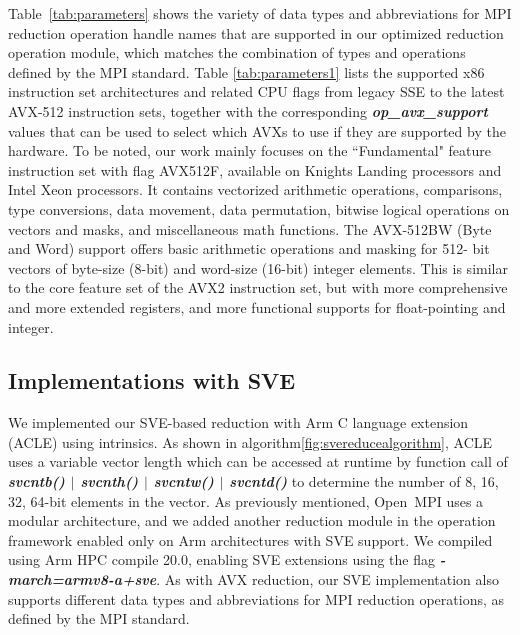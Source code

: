 \documentclass[5p,times,twocolumn]{elsarticle}
\newcommand{\ompi}[0]{Open~MPI\xspace}
\newcommand{\mpi}[0]{\textsc{MPI}\xspace}
\begin{document}
%
Table~\ref{tab:parameters} shows the variety of data types and
abbreviations for \mpi reduction operation handle names that are supported
in our optimized reduction operation
module, which matches the combination of types and operations defined
by the \mpi standard.
Table \ref{tab:parameters1} lists the supported x86 instruction set
architectures and related CPU flags from legacy SSE to the latest
AVX-512 instruction sets, together with the corresponding
\emph{\textbf{\textit{op_avx_support}}} values that can be used to select
which AVXs to use if they are supported by the hardware.
To be noted, our work mainly focuses on the
``Fundamental" feature instruction set with flag AVX512F, available on
Knights Landing processors and Intel Xeon processors. It contains
vectorized arithmetic operations, comparisons, type conversions, data
movement, data permutation, bitwise logical operations on vectors and
masks, and miscellaneous math functions.
The AVX-512BW (Byte and Word) support offers basic arithmetic operations and masking for 512-
bit vectors of byte-size (8-bit) and word-size (16-bit) integer elements. This is similar to the core
feature set of the AVX2 instruction set, but with more
comprehensive and more extended registers, and more functional supports for
float-pointing and integer.

\subsection{Implementations with SVE}
We implemented our SVE-based reduction with Arm
C language extension (ACLE) using intrinsics. As shown in algorithm\ref{fig:svereducealgorithm},
ACLE uses a variable vector length which can be accessed at runtime by
function call of \emph{\textbf{\textit{svcntb() $\mid$ svcnth() $\mid$ svcntw() $\mid$ svcntd()}}} to
determine the number of 8, 16, 32, 64-bit elements in the vector.
As previously mentioned, \ompi uses a modular architecture,
and we added another reduction module in the operation framework enabled only on Arm architectures with SVE support. We compiled using Arm HPC compile 20.0, enabling SVE extensions using the
flag \emph{\textbf{\textit{-march=armv8-a+sve}}}. As with AVX reduction,
our SVE implementation also supports different data types and
abbreviations for \mpi reduction operations, as defined
by the \mpi standard.
\end{document}
